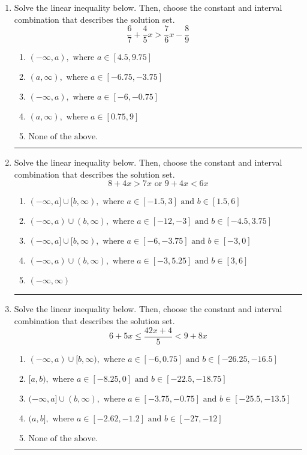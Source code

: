 \documentclass[14pt]{extbook}
\newcommand{\litem}[1]{\item#1\hspace*{-1cm}\rule{\textwidth}{0.4pt}}
\begin{document}
\begin{enumerate}
{\begin{enumerate}[label=\Alph*.]
\end{enumerate} }
\litem{
Solve the linear inequality below. Then, choose the constant and interval combination that describes the solution set.\[ \frac{6}{7} + \frac{4}{5} x > \frac{7}{6} x - \frac{8}{9} \]\begin{enumerate}[label=\Alph*.]
\item \( (-\infty, a), \text{ where } a \in [4.5, 9.75] \)
\item \( (a, \infty), \text{ where } a \in [-6.75, -3.75] \)
\item \( (-\infty, a), \text{ where } a \in [-6, -0.75] \)
\item \( (a, \infty), \text{ where } a \in [0.75, 9] \)
\item \( \text{None of the above}. \)

\end{enumerate} }
\litem{
Solve the linear inequality below. Then, choose the constant and interval combination that describes the solution set.\[ 8 + 4 x > 7 x \text{ or } 9 + 4 x < 6 x \]\begin{enumerate}[label=\Alph*.]
\item \( (-\infty, a] \cup [b, \infty), \text{ where } a \in [-1.5, 3] \text{ and } b \in [1.5, 6] \)
\item \( (-\infty, a) \cup (b, \infty), \text{ where } a \in [-12, -3] \text{ and } b \in [-4.5, 3.75] \)
\item \( (-\infty, a] \cup [b, \infty), \text{ where } a \in [-6, -3.75] \text{ and } b \in [-3, 0] \)
\item \( (-\infty, a) \cup (b, \infty), \text{ where } a \in [-3, 5.25] \text{ and } b \in [3, 6] \)
\item \( (-\infty, \infty) \)

\end{enumerate} }
\litem{
Solve the linear inequality below. Then, choose the constant and interval combination that describes the solution set.\[ 6 + 5 x \leq \frac{42 x + 4}{5} < 9 + 8 x \]\begin{enumerate}[label=\Alph*.]
\item \( (-\infty, a) \cup [b, \infty), \text{ where } a \in [-6, 0.75] \text{ and } b \in [-26.25, -16.5] \)
\item \( [a, b), \text{ where } a \in [-8.25, 0] \text{ and } b \in [-22.5, -18.75] \)
\item \( (-\infty, a] \cup (b, \infty), \text{ where } a \in [-3.75, -0.75] \text{ and } b \in [-25.5, -13.5] \)
\item \( (a, b], \text{ where } a \in [-2.62, -1.2] \text{ and } b \in [-27, -12] \)
\item \( \text{None of the above.} \)

\end{enumerate} }
\end{enumerate}
\end{document}
